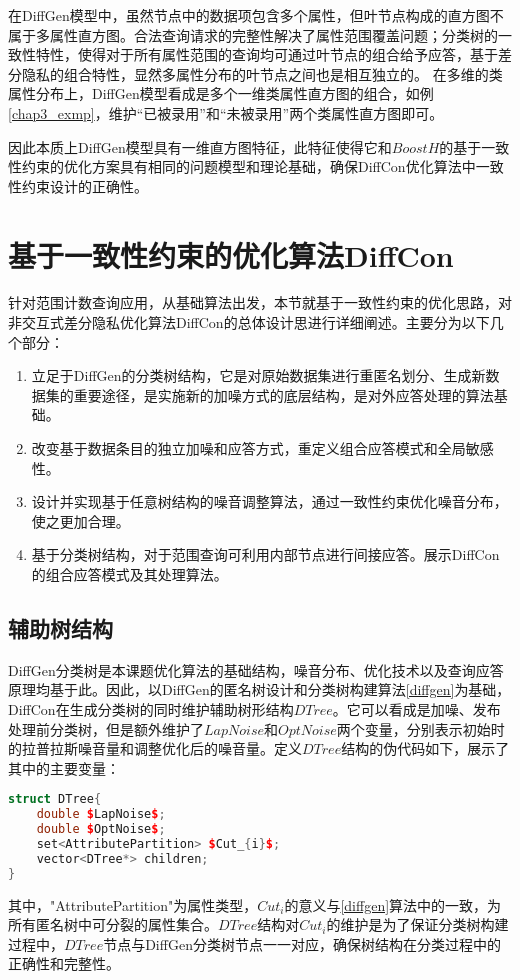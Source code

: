 在DiffGen模型中，虽然节点中的数据项包含多个属性，但叶节点构成的直方图不属于多属性直方图。合法查询请求的完整性解决了属性范围覆盖问题；分类树的一致性特性，使得对于所有属性范围的查询均可通过叶节点的组合给予应答，基于差分隐私的组合特性\cite{dpcombination}，显然多属性分布的叶节点之间也是相互独立的。
在多维的类属性分布上，DiffGen模型看成是多个一维类属性直方图的组合，如例\ref{chap3_exmp}，维护“已被录用”和“未被录用”两个类属性直方图即可。

因此本质上DiffGen模型具有一维直方图特征，此特征使得它和$BoostH$的基于一致性约束的优化方案具有相同的问题模型和理论基础，确保DiffCon优化算法中一致性约束设计的正确性。


\section{基于一致性约束的优化算法DiffCon}

针对范围计数查询应用，从基础算法出发，本节就基于一致性约束的优化思路，对非交互式差分隐私优化算法DiffCon的总体设计思进行详细阐述。主要分为以下几个部分：
\begin{enumerate}
	\item 立足于DiffGen的分类树结构，它是对原始数据集进行重匿名划分、生成新数据集的重要途径，是实施新的加噪方式的底层结构，是对外应答处理的算法基础。
	\item 改变基于数据条目的独立加噪和应答方式，重定义组合应答模式和全局敏感性。
	\item 设计并实现基于任意树结构的噪音调整算法，通过一致性约束优化噪音分布，使之更加合理。
	\item 基于分类树结构，对于范围查询可利用内部节点进行间接应答。展示DiffCon的组合应答模式及其处理算法。
\end{enumerate}

\subsection{辅助树结构}

DiffGen分类树是本课题优化算法的基础结构，噪音分布、优化技术以及查询应答原理均基于此。因此，以DiffGen的匿名树设计和分类树构建算法\ref{diffgen}为基础，DiffCon在生成分类树的同时维护辅助树形结构$DTree$。它可以看成是加噪、发布处理前分类树，但是额外维护了$LapNoise$和$OptNoise$两个变量，分别表示初始时的拉普拉斯噪音量和调整优化后的噪音量。定义$DTree$结构的伪代码如下，展示了其中的主要变量：

\begin{lstlisting}[language={C++}, caption={DTree结构伪代码}]
struct DTree{
	double $LapNoise$;
	double $OptNoise$;
	set<AttributePartition> $Cut_{i}$;
	vector<DTree*> children;
}
\end{lstlisting}
其中，"AttributePartition"为属性类型，$Cut_{i}$的意义与\ref{diffgen}算法中的一致，为所有匿名树中可分裂的属性集合。$DTree$结构对$Cut_{i}$的维护是为了保证分类树构建过程中，$DTree$节点与DiffGen分类树节点一一对应，确保树结构在分类过程中的正确性和完整性。


